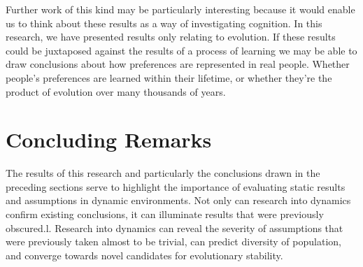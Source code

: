 \documentclass[11pt]{book}
\newcommand*{\np}{\par\noindent\newline}
\begin{document}
\np Further work of this kind may be particularly interesting because it would enable us to think about these results as a way of investigating cognition.
In this research, we have presented results only relating to evolution.
If these results could be juxtaposed against the results of a process of learning we may be able to draw conclusions about how preferences are represented in real people.
Whether people's preferences are learned within their lifetime, or whether they're the product of evolution over many thousands of years.

\section{Concluding Remarks}
The results of this research and particularly the conclusions drawn in the preceding sections serve to highlight the importance of evaluating static results and assumptions in dynamic environments.
Not only can research into dynamics confirm existing conclusions, it can illuminate results that were previously obscured.l.
Research into dynamics can reveal the severity of assumptions that were previously taken almost to be trivial, can predict diversity of population, and converge towards novel candidates for evolutionary stability. 
 


\end{document}
